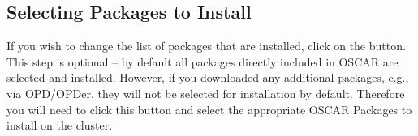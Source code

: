 \subsection{Selecting Packages to Install}
\label{det:select-packages}

\optional

If you wish to change the list of packages that are installed, click
on the  button.  This step is
optional -- by default all packages directly included in OSCAR are 
selected and installed.  However, if you downloaded any additional packages, 
e.g., via OPD/OPDer, they will not be selected for installation by default.  
Therefore you will need to click this button and select the appropriate OSCAR 
Packages to install on the cluster.

